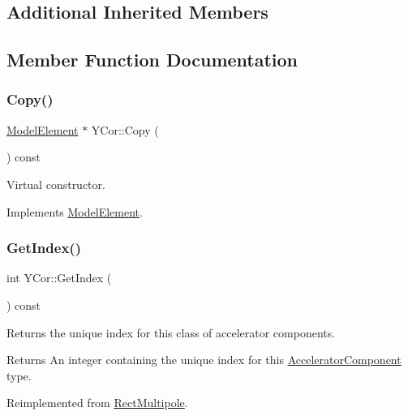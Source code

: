 \subsection*{Additional Inherited Members}


\subsection{Member Function Documentation}
\mbox{\label{classYCor_a3abe7858695c36ee89e50836d0a908b8}} 
\subsubsection{\texorpdfstring{Copy()}{Copy()}}
{\footnotesize\ttfamily \hyperlink{classModelElement}{Model\+Element} $\ast$ Y\+Cor\+::\+Copy (\begin{DoxyParamCaption}{ }\end{DoxyParamCaption}) const\hspace{0.3cm}{\ttfamily [virtual]}}

Virtual constructor. 

Implements \hyperlink{classModelElement_ac3ca26d649bd86a0f31a58ae09941429}{Model\+Element}.

\mbox{\label{classYCor_a7e13236734c9ea7f52ecc2ee27523c4f}} 
\subsubsection{\texorpdfstring{Get\+Index()}{GetIndex()}}
{\footnotesize\ttfamily int Y\+Cor\+::\+Get\+Index (\begin{DoxyParamCaption}{ }\end{DoxyParamCaption}) const\hspace{0.3cm}{\ttfamily [virtual]}}

Returns the unique index for this class of accelerator components. \begin{DoxyReturn}{Returns}
An integer containing the unique index for this \hyperlink{classAcceleratorComponent}{Accelerator\+Component} type. 
\end{DoxyReturn}


Reimplemented from \hyperlink{classRectMultipole_a9bc789b2a193e341aab8bbd47a0e3ad4}{Rect\+Multipole}.

